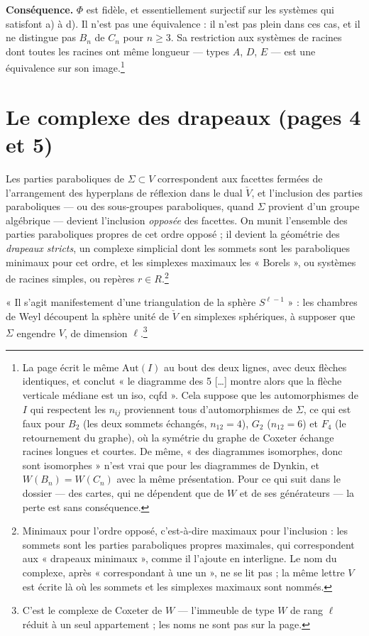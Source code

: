 \documentclass[11pt,a4paper]{article}
\begin{document}
\textbf{Conséquence.} $\Phi$ est fidèle, et essentiellement surjectif sur les
systèmes qui satisfont a) à d). Il n'est pas une équivalence : il n'est pas
plein dans ces cas, et il ne distingue pas $B_{n}$
de $C_{n}$ pour $n \geq 3$. Sa restriction aux systèmes de racines dont toutes
les racines ont même longueur --- types $A$, $D$, $E$ --- est une équivalence
sur son image.\footnote{La page écrit le même $\mathrm{Aut}(I)$ au bout des
deux lignes, avec deux flèches identiques, et conclut « le diagramme des 5 […]
montre alors que la flèche verticale médiane est un iso, cqfd ». Cela suppose
que les automorphismes de $I$ qui respectent les $n_{ij}$ proviennent tous
d'automorphismes de $\Sigma$, ce qui est faux pour $B_{2}$ (les deux sommets
échangés, $n_{12} = 4$), $G_{2}$ ($n_{12} = 6$) et $F_{4}$ (le retournement du
graphe), où la symétrie du graphe de Coxeter échange racines longues et
courtes. De même, « des diagrammes isomorphes, donc sont isomorphes » n'est
vrai que pour les diagrammes de Dynkin, et $W(B_{n}) = W(C_{n})$ avec la même
présentation. Pour ce qui suit dans le dossier --- des cartes, qui ne
dépendent que de $W$ et de ses générateurs --- la perte est sans
conséquence.}

\section*{Le complexe des drapeaux (pages 4 et 5)}

Les parties paraboliques de $\Sigma \subset V$ correspondent aux facettes
fermées de l'arrangement des hyperplans de réflexion dans le dual
$\check{V}$, et l'inclusion des parties paraboliques --- ou des sous-groupes
paraboliques, quand $\Sigma$ provient d'un groupe algébrique --- devient
l'inclusion \emph{opposée} des facettes. On munit l'ensemble des parties
paraboliques propres de cet ordre opposé ; il devient la géométrie des
\emph{drapeaux stricts}, un complexe simplicial dont les sommets sont les
paraboliques minimaux pour cet ordre, et les simplexes maximaux les
« Borels », ou systèmes de racines simples, ou repères
$r \in R$.\footnote{Minimaux pour l'ordre opposé, c'est-à-dire maximaux pour
l'inclusion : les sommets sont les parties paraboliques propres maximales,
qui correspondent aux « drapeaux minimaux », comme il l'ajoute en interligne.
Le nom du complexe, après « correspondant à une un », ne se lit pas ; la même
lettre $V$ est écrite là où les sommets et les simplexes maximaux sont
nommés.}

« Il s'agit manifestement d'une triangulation de la sphère $S^{\ell - 1}$ » :
les chambres de Weyl découpent la sphère unité de $\check{V}$ en simplexes
sphériques, à supposer que $\Sigma$ engendre $V$, de dimension
$\ell$.\footnote{C'est le complexe de Coxeter de $W$ --- l'immeuble de type $W$
de rang $\ell$ réduit à un seul appartement ; les noms ne sont pas sur la
page.}
\end{document}
